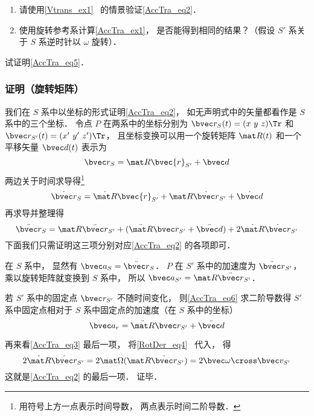 \begin{exercise}{}\label{AccTra_exe1}
\begin{enumerate}
\item 请使用\autoref{Vtrans_ex1}~ 的情景验证\autoref{AccTra_eq2}．
\item 使用旋转参考系计算\autoref{AccTra_ex1}， 是否能得到相同的结果？（假设 $S'$ 系关于 $S$ 系逆时针以 $\omega$ 旋转）．
\end{enumerate}
\end{exercise}

\begin{exercise}{}
试证明\autoref{AccTra_eq5}．
\end{exercise}

\subsubsection{证明（旋转矩阵）}
我们在 $S$ 系中以坐标的形式证明\autoref{AccTra_eq2}， 如无声明式中的矢量都看作是 $S$ 系中的三个坐标． 令点 $P$ 在两系中的坐标分别为 $\bvec r_S(t) = (x\ y\ z)\Tr$ 和 $\bvec r_{S'}(t) = (x'\ y'\ z')\Tr$， 且坐标变换可以用一个旋转矩阵 $\mat R(t)$ 和一个平移矢量 $\bvec d(t)$ 表示为
\begin{equation}\label{AccTra_eq6}
\bvec r_S = \mat R \bvec{r}_{S'} + \bvec d
\end{equation}
两边关于时间求导得\footnote{用符号上方一点表示时间导数， 两点表示时间二阶导数．}
\begin{equation}
\dot{\bvec r}_S = \dot{\mat R} \bvec{r}_{S'} + \mat R \dot{\bvec r}_{S'}+ \dot{\bvec d}
\end{equation}
再求导并整理得
\begin{equation}\label{AccTra_eq3}
\ddot{\bvec r}_S = \mat R \ddot{\bvec r}_{S'} + (\ddot{\mat R} \bvec r_{S'} + \ddot{\bvec d}) + 2 \dot{\mat R} \dot{\bvec r}_{S'}
\end{equation}
下面我们只需证明这三项分别对应\autoref{AccTra_eq2} 的各项即可．

在 $S$ 系中， 显然有 $\bvec a_S = \ddot{\bvec r}_S$． $P$ 在 $S'$ 系中的加速度为 $\ddot{\bvec r}_{S'}$， 乘以旋转矩阵就变换到 $S$ 系中， 所以 $\bvec a_{S'} = \mat R \ddot{\bvec r}_{S'}$．

若 $S'$ 系中的固定点 $\bvec r_{S'}$ 不随时间变化， 则\autoref{AccTra_eq6} 求二阶导数得 $S'$ 系中固定点相对于 $S$ 系中固定点的加速度（在 $S$ 系中的坐标）
\begin{equation}
\bvec a_r = \ddot{\mat R} \bvec r_{S'} + \ddot{\bvec d}
\end{equation}

再来看\autoref{AccTra_eq3} 最后一项， 将\autoref{RotDer_eq4}~ 代入， 得
\begin{equation}
2\dot{\mat R} \dot{\bvec r}_{S'} = 2\mat\Omega (\mat R \dot{\bvec r}_{S'}) = 2\bvec \omega \cross \bvec v_{S'}
\end{equation}
这就是\autoref{AccTra_eq2} 的最后一项． 证毕．
